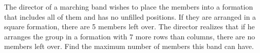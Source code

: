 The director of a marching band wishes to place the members into a formation that includes all of them and has no unfilled positions. If they are arranged in a square formation, there are 5 members left over. The director realizes that if he arranges the group in a formation with 7 more rows than columns, there are no members left over. Find the maximum number of members this band can have.